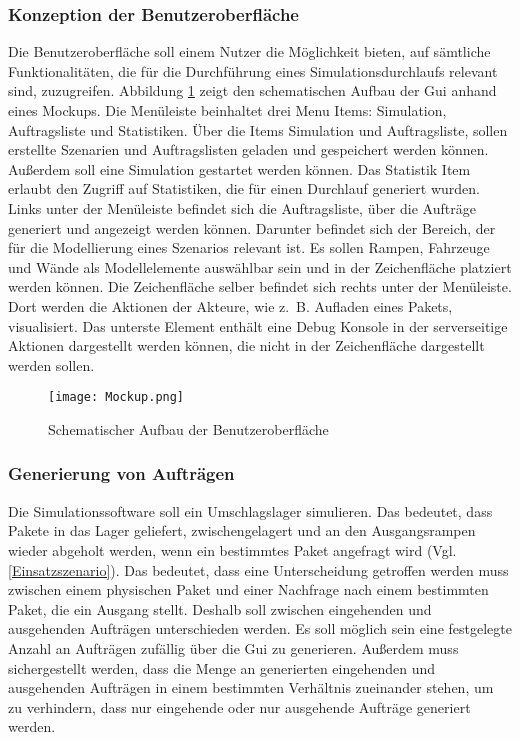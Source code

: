 \subsubsection{Konzeption der Benutzeroberfläche}
Die Benutzeroberfläche soll einem Nutzer die Möglichkeit bieten, auf sämtliche Funktionalitäten, die für die Durchführung eines Simulationsdurchlaufs relevant sind, zuzugreifen. Abbildung \ref{GUI} zeigt den schematischen Aufbau der Gui anhand eines Mockups. Die Menüleiste beinhaltet drei Menu Items: Simulation, Auftragsliste und Statistiken. Über die Items Simulation und Auftragsliste, sollen erstellte Szenarien und Auftragslisten geladen und gespeichert werden können. Außerdem soll eine Simulation gestartet werden können. Das Statistik Item erlaubt den Zugriff auf Statistiken, die für einen Durchlauf generiert wurden. Links unter der Menüleiste befindet sich die Auftragsliste, über die Aufträge generiert und angezeigt werden können. Darunter befindet sich der Bereich, der für die Modellierung eines Szenarios relevant ist. Es sollen Rampen, Fahrzeuge und Wände als Modellelemente auswählbar sein und in der Zeichenfläche platziert werden können. Die Zeichenfläche selber befindet sich rechts unter der Menüleiste. Dort werden die Aktionen der Akteure, wie z.~B. Aufladen eines Pakets, visualisiert. Das unterste Element enthält eine Debug Konsole in der serverseitige Aktionen dargestellt werden können, die nicht in der Zeichenfläche dargestellt werden sollen. 
\begin{figure}[h!]
	\centering
		\texttt{[image: Mockup.png]}        
		\caption{Schematischer Aufbau der Benutzeroberfläche}
	\label{GUI}
\end{figure}
\subsubsection{Generierung von Aufträgen}
Die Simulationssoftware soll ein Umschlagslager simulieren. Das bedeutet, dass Pakete in das Lager geliefert, zwischengelagert und an den Ausgangsrampen wieder abgeholt werden, wenn ein bestimmtes Paket angefragt wird (Vgl.\ref{Einsatzszenario}). Das bedeutet, dass eine Unterscheidung getroffen werden muss zwischen einem physischen Paket und einer Nachfrage nach einem bestimmten Paket, die ein Ausgang stellt. Deshalb soll zwischen eingehenden und ausgehenden Aufträgen unterschieden werden. Es soll möglich sein eine festgelegte Anzahl an Aufträgen zufällig über die Gui zu generieren. Außerdem muss sichergestellt werden, dass die Menge an generierten eingehenden und ausgehenden Aufträgen in einem bestimmten Verhältnis zueinander stehen, um zu verhindern, dass nur eingehende oder nur ausgehende Aufträge generiert werden. 
